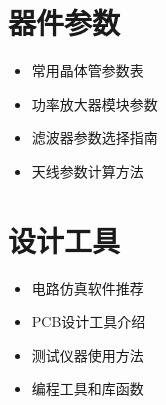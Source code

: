 \documentclass[12pt,UTF8]{ctexbook}
\begin{document}
\section{器件参数}
\begin{itemize}[leftmargin=3.5em]
    \item 常用晶体管参数表
    \item 功率放大器模块参数
    \item 滤波器参数选择指南
    \item 天线参数计算方法
\end{itemize}

\section{设计工具}
\begin{itemize}[leftmargin=3.5em]
    \item 电路仿真软件推荐
    \item PCB设计工具介绍
    \item 测试仪器使用方法
    \item 编程工具和库函数
\end{itemize}
\end{document}
